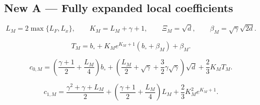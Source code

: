 \documentclass[11pt,a4paper]{report}
\begin{document}
\subsection{\texorpdfstring{New A — Fully expanded local coefficients}{New A — Fully expanded local coefficients}}




\[L_M=2\max\{L_F,L_x\},\qquad K_M=L_M+\gamma+1,\qquad\Xi_M=\sqrt d,\qquad\beta_M=\sqrt\gamma\sqrt{2d}.\]







\[T_M=b_\circ+K_Me^{K_M+1}(b_\circ+\beta_M)+\beta_M.\]







\[c_{0,M}=\left(\frac{\gamma+1}{2}+\frac{L_M}{4}\right)b_\circ+\left(\frac{L_M}{2}+\sqrt\gamma+\frac32\gamma\sqrt\gamma\right)\sqrt d+\frac23K_MT_M.\]







\[c_{1,M}=\frac{\gamma^2+\gamma+L_M}{2}+\left(\frac{\gamma+1}{2}+\frac{L_M}{4}\right)L_M+\frac23K_M^2e^{K_M+1}.\]
\end{document}

